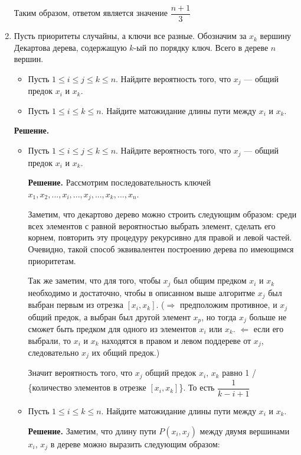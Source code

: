\begin{enumerate}
	Таким образом, ответом является значение $\dfrac{n + 1}{3}$
	
	\item Пусть приоритеты случайны, а ключи все разные. Обозначим за $x_k$ вершину Декартова дерева,	содержащую $k$-ый по порядку ключ. Всего в дереве $n$ вершин.
	\begin{itemize}
		\item Пусть $1 \leqslant i \leqslant j \leqslant k \leqslant n$. Найдите вероятность того, что $x_j$ — общий предок $x_i$ и $x_k$.
		\item Пусть $1 \leqslant i \leqslant k \leqslant n$. Найдите матожидание длины пути между $x_i$ и $x_k$.
	\end{itemize}
	
	\textbf{Решение.}
	
	\begin{itemize}
		\item Пусть $1 \leqslant i \leqslant j \leqslant k \leqslant n$. Найдите вероятность того, что $x_j$ — общий предок $x_i$ и $x_k$.
		
		\textbf{Решение.} Рассмотрим последовательность ключей $x_1, x_2, ..., x_i, ..., x_j,..., x_k, ..., x_n$.
		
		Заметим, что декартово дерево можно строить следующим образом: среди всех элементов с равной вероятностью выбрать элемент, сделать его корнем, повторить эту процедуру рекурсивно для правой и левой частей. Очевидно, такой способ эквивалентен построению дерева по имеющимся приоритетам.
		
		Так же заметим, что для того, чтобы $x_j$ был общим предком $x_i$ и $x_k$ необходимо и достаточно, чтобы в описанном выше алгоритме $x_j$ был выбран первым из отрезка $[x_i, x_k]$. ($\Rightarrow$ предположим противное, и $x_j$ общий предок, а выбран был другой элемент $x_p$, но тогда $x_j$ больше не сможет быть предком для одного из элементов $x_i$ или $x_k$. $\Leftarrow$ если его выбрали, то $x_i$ и $x_k$ находятся в правом и левом поддереве от $x_j$, следовательно $x_j$ их общий предок.)
		
		Значит вероятность того, что $x_j$ общий предок $x_i$, $x_k$ равно 1 / \{количество элементов в отрезке $[x_i, x_k]$\}. То есть $\dfrac{1}{k - i + 1}$
		
		\item Пусть $1 \leqslant i \leqslant k \leqslant n$. Найдите матожидание длины пути между $x_i$ и $x_k$.
		
		\textbf{Решение.} Заметим, что длину пути $P(x_i, x_j)$ между двумя вершинами $x_i$, $x_j$ в дереве можно выразить следующим образом:
		

\end{itemize}
\end{enumerate}

